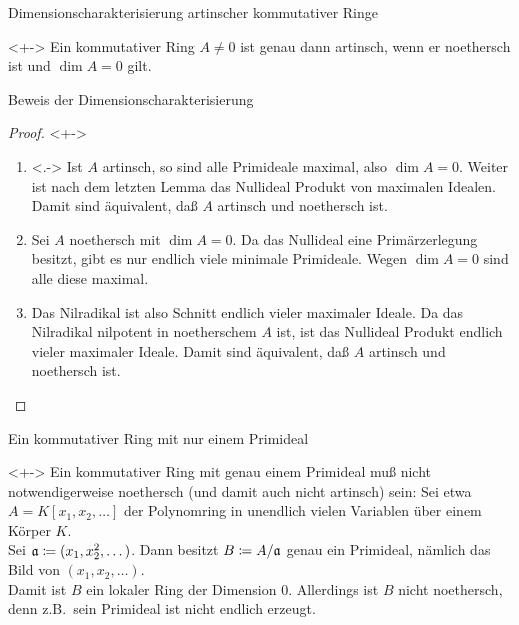 \begin{frame}{Dimensionscharakterisierung artinscher kommutativer Ringe}
	\begin{theorem}<+->
		Ein kommutativer Ring \(A \neq 0\) ist genau dann artinsch, wenn er
		noethersch ist und \(\dim A = 0\) gilt.
	\end{theorem}
\end{frame}

\begin{frame}{Beweis der Dimensionscharakterisierung}
	\begin{proof}<+->
		\begin{enumerate}[<+->]
		\item<.->
			Ist \(A\) artinsch, so sind alle Primideale maximal, also \(\dim
			A = 0\). Weiter ist nach dem letzten Lemma das Nullideal Produkt
			von maximalen Idealen. Damit sind äquivalent, daß \(A\) artinsch und
			noethersch ist.
		\item
			Sei \(A\) noethersch mit \(\dim A = 0\). Da das Nullideal eine
			Primärzerlegung besitzt, gibt es nur endlich viele minimale
			Primideale. Wegen \(\dim A = 0\) sind alle diese maximal.
		\item
			Das Nilradikal ist also Schnitt endlich vieler maximaler Ideale.
			Da das Nilradikal nilpotent in noetherschem \(A\) ist, ist
			das Nullideal Produkt endlich vieler
			maximaler Ideale. Damit sind äquivalent, daß \(A\) artinsch und
			noethersch ist.
			\qedhere
		\end{enumerate}
	\end{proof}
\end{frame}

\begin{frame}{Ein kommutativer Ring mit nur einem Primideal}
	\begin{example}<+->
		Ein kommutativer Ring mit genau einem Primideal muß nicht
		notwendigerweise noethersch (und damit auch nicht artinsch) sein: Sei
		etwa \(A = K[x_1, x_2, \dotsc]\) der Polynomring in unendlich vielen
		Variablen über einem Körper \(K\).
		\\
		Sei \(\mathfrak{a} \coloneqq (x_1, x_2^2, \dotsc)\). Dann besitzt
		\(B \coloneqq A/\mathfrak{a}\) genau ein Primideal, nämlich das Bild von
		\((x_1, x_2, \dotsc)\).
		\\
		Damit ist \(B\) ein lokaler Ring der Dimension \(0\). Allerdings ist
		\(B\) nicht noethersch, denn z.B.~sein Primideal ist nicht endlich
		erzeugt.
	\end{example}
\end{frame}

